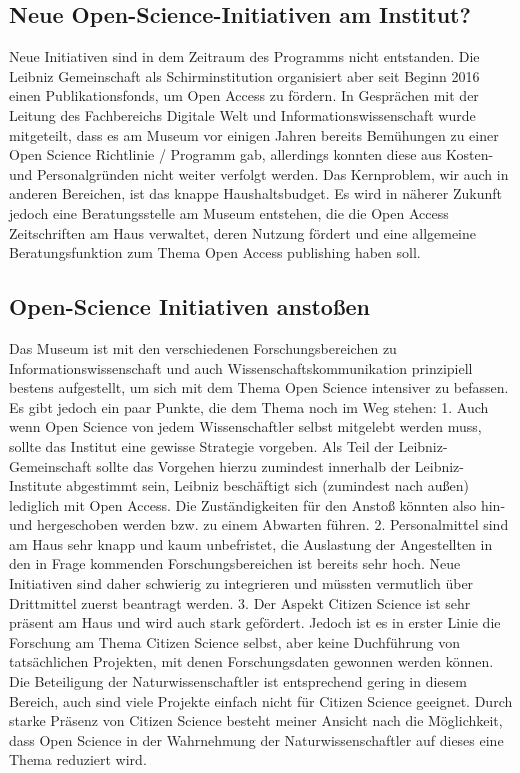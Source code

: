 \documentclass[11pt,a4paper]{article}
\begin{document}
\subsection{Neue Open-Science-Initiativen am Institut?}
Neue Initiativen sind in dem Zeitraum des Programms nicht entstanden. Die Leibniz Gemeinschaft als Schirminstitution organisiert aber seit Beginn 2016 einen Publikationsfonds, um Open Access zu fördern.
In Gesprächen mit der Leitung des Fachbereichs Digitale Welt und Informationswissenschaft wurde mitgeteilt, dass es am Museum vor einigen Jahren bereits Bemühungen zu einer Open Science Richtlinie / Programm gab, allerdings konnten diese aus Kosten- und Personalgründen nicht weiter verfolgt werden. Das Kernproblem, wir auch in anderen Bereichen, ist das knappe Haushaltsbudget. Es wird in näherer Zukunft jedoch eine Beratungsstelle am Museum entstehen, die die Open Access Zeitschriften am Haus verwaltet, deren Nutzung fördert und eine allgemeine Beratungsfunktion zum Thema Open Access publishing haben soll.



\subsection{Open-Science Initiativen anstoßen}
Das Museum ist mit den verschiedenen Forschungsbereichen zu Informationswissenschaft und auch Wissenschaftskommunikation prinzipiell bestens aufgestellt, um sich mit dem Thema Open Science intensiver zu befassen. Es gibt jedoch ein paar Punkte, die dem Thema noch im Weg stehen:
1. Auch wenn Open Science von jedem Wissenschaftler selbst mitgelebt werden muss, sollte das Institut eine gewisse Strategie vorgeben. Als Teil der Leibniz-Gemeinschaft sollte das Vorgehen hierzu zumindest innerhalb der Leibniz-Institute abgestimmt sein, Leibniz beschäftigt sich (zumindest nach außen) lediglich mit Open Access. Die Zuständigkeiten für den Anstoß könnten also hin- und hergeschoben werden bzw. zu einem Abwarten führen.
2. Personalmittel sind am Haus sehr knapp und kaum unbefristet, die Auslastung der Angestellten in den in Frage kommenden Forschungsbereichen ist bereits sehr hoch. Neue Initiativen sind daher schwierig zu integrieren und müssten vermutlich über Drittmittel zuerst beantragt werden.
3.  Der Aspekt Citizen Science ist sehr präsent am Haus und wird auch stark gefördert. Jedoch ist es in erster Linie die Forschung am Thema Citizen Science selbst, aber keine Duchführung von tatsächlichen Projekten, mit denen Forschungsdaten gewonnen werden können. Die Beteiligung der Naturwissenschaftler ist entsprechend gering in diesem Bereich, auch sind viele Projekte einfach nicht für Citizen Science geeignet. Durch starke Präsenz von Citizen Science besteht meiner Ansicht nach die Möglichkeit, dass Open Science in der Wahrnehmung der Naturwissenschaftler auf dieses eine Thema reduziert wird.
\end{document}
